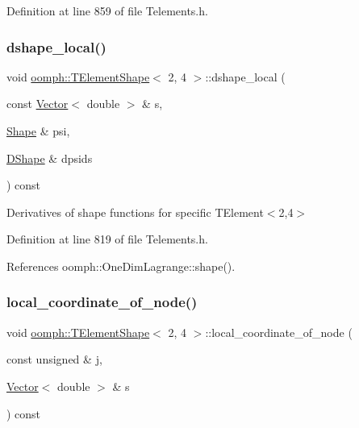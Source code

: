 Definition at line 859 of file Telements.\+h.

\mbox{\label{classoomph_1_1TElementShape_3_012_00_014_01_4_a709ab96252fdb823348a45eb707b1f52}} 
\subsubsection{\texorpdfstring{dshape\+\_\+local()}{dshape\_local()}}
{\footnotesize\ttfamily void \hyperlink{classoomph_1_1TElementShape}{oomph\+::\+T\+Element\+Shape}$<$ 2, 4 $>$\+::dshape\+\_\+local (\begin{DoxyParamCaption}\item[{const \hyperlink{classoomph_1_1Vector}{Vector}$<$ double $>$ \&}]{s,  }\item[{\hyperlink{classoomph_1_1Shape}{Shape} \&}]{psi,  }\item[{\hyperlink{classoomph_1_1DShape}{D\+Shape} \&}]{dpsids }\end{DoxyParamCaption}) const\hspace{0.3cm}{\ttfamily [inline]}}



Derivatives of shape functions for specific T\+Element$<$2,4$>$ 



Definition at line 819 of file Telements.\+h.



References oomph\+::\+One\+Dim\+Lagrange\+::shape().

\mbox{\label{classoomph_1_1TElementShape_3_012_00_014_01_4_a91216e39bba40b1a960db0d455465064}} 
\subsubsection{\texorpdfstring{local\+\_\+coordinate\+\_\+of\+\_\+node()}{local\_coordinate\_of\_node()}}
{\footnotesize\ttfamily void \hyperlink{classoomph_1_1TElementShape}{oomph\+::\+T\+Element\+Shape}$<$ 2, 4 $>$\+::local\+\_\+coordinate\+\_\+of\+\_\+node (\begin{DoxyParamCaption}\item[{const unsigned \&}]{j,  }\item[{\hyperlink{classoomph_1_1Vector}{Vector}$<$ double $>$ \&}]{s }\end{DoxyParamCaption}) const\hspace{0.3cm}{\ttfamily [inline]}}



